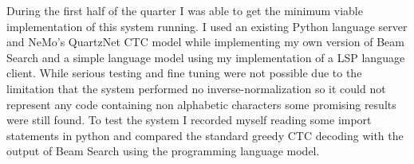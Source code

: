 \documentclass{article}
\begin{document}
\begin{figure}[h]
    \centering
    \vspace{0.5cm}

\end{figure}

During the first half of the quarter I was able to get the minimum viable implementation of this system running. I used an existing Python language server \cite{pylsp} and NeMo's QuartzNet CTC model \cite{qua} while implementing my own version of Beam Search and a simple language model using my implementation of a LSP language client. While serious testing and fine tuning were not possible due to the limitation that the system performed no inverse-normalization so it could not represent any code containing non alphabetic characters some promising results were still found. To test the system I recorded myself reading some import statements in python and compared the standard greedy CTC decoding with the output of Beam Search using the programming language model.
\end{document}
